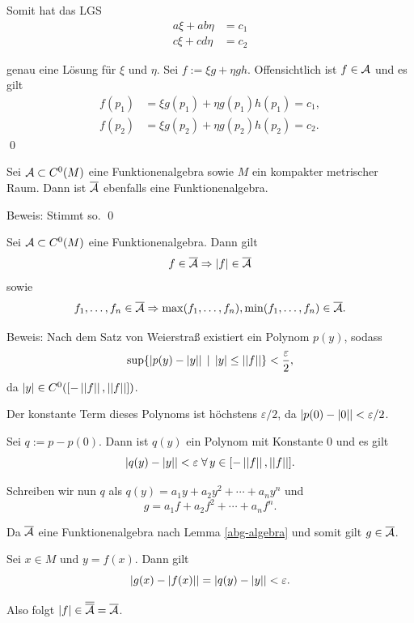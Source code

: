 \begin{frame}
    Somit hat das LGS 
    \begin{align*}
        a \xi + ab \eta &= c_1 \\
        c \xi + cd \eta &= c_2
    \end{align*}

    genau eine Lösung für \( \xi \) und \( \eta \). 
    \pause
    Sei \( f := \xi g + \eta g h \). \pause 
    Offensichtlich ist \( f \in \mathcal{A} \) \pause 
    und es gilt 
    \begin{align*}
        f(p_1) &= \xi g(p_1) + \eta g(p_1) h(p_1) = c_1, \\
        f(p_2) &= \xi g(p_2) + \eta g(p_2) h(p_2) = c_2.
    \end{align*}
    \qed
\end{frame}

\begin{frame}
    \begin{lem}\label{abg-algebra}
        Sei \( \mathcal{A} \subset C^0(M) \) eine Funktionenalgebra 
        sowie \(M\) ein kompakter metrischer Raum.
        Dann ist \( \overline{\mathcal{A}} \) ebenfalls eine Funktionenalgebra.
    \end{lem}
    Beweis: \pause 
    Stimmt so. \qed
\end{frame}

\begin{frame}
    \begin{lem}\label{betrag-in-algebra}
        Sei \( \mathcal{A} \subset C^0(M) \) eine Funktionenalgebra. Dann gilt 
        \[ f \in \overline{\mathcal{A}} \Rightarrow \left|f\right| \in \overline{\mathcal{A}} \]
        sowie 
        \[ f_1, \ldots, f_n \in \overline{\mathcal{A}} \Rightarrow \max(f_1,\ldots, f_n), \min(f_1,\ldots, f_n) \in \overline{\mathcal{A}}. \]
    \end{lem} \pause
    Beweis:
    Nach dem Satz von Weierstraß existiert ein Polynom 
    \( p(y) \), sodass 
    \[ \sup \{ \left| p(y) - \left|y\right| \right| 
    \;|\; \left|y\right| \leq \left|\left|f\right|\right| \} < \frac{\varepsilon}{2}, \]
    da \( \left|y\right| \in C^0([-\left|\left|f\right|\right|, \left|\left|f\right|\right|]) \). 
    \pause

    Der konstante Term dieses Polynoms ist höchstens \( \varepsilon / 2 \), 
    da \( \left| p(0) - \left|0\right| \right| < \varepsilon/2 \).
\end{frame}

\begin{frame}
    Sei \( q := p - p(0) \). Dann ist \( q(y) \) ein 
    Polynom mit Konstante \(0\) und es gilt 
    \[ \abs{ q(y) - \abs{y} } < \varepsilon 
    \;\forall y \in [-\norm{f}, \norm{f}]. \]
    \pause

    Schreiben wir nun \( q \) als 
    \( q(y) = a_1 y + a_2 y^2 + \cdots + a_n y^n \) und 
    \[ g = a_1 f + a_2 f^2 + \cdots + a_n f^n. \]
    \pause

    Da \( \overline{\mathcal{A}} \) eine Funktionenalgebra nach Lemma \ref{abg-algebra}
    und somit gilt 
    \( g \in \overline{\mathcal{A}} \). 
    \pause

    Sei \( x\in M \) und \( y = f(x) \). Dann gilt 
    \[ \left| g(x) - \left|f(x)\right| \right| = \left| q(y) - \left|y\right| \right| < \varepsilon. \]
    \pause
    
    Also folgt \( \left|f\right| \in \overline{\overline{\mathcal{A}}} = \overline{\mathcal{A}} \). 
\end{frame}

